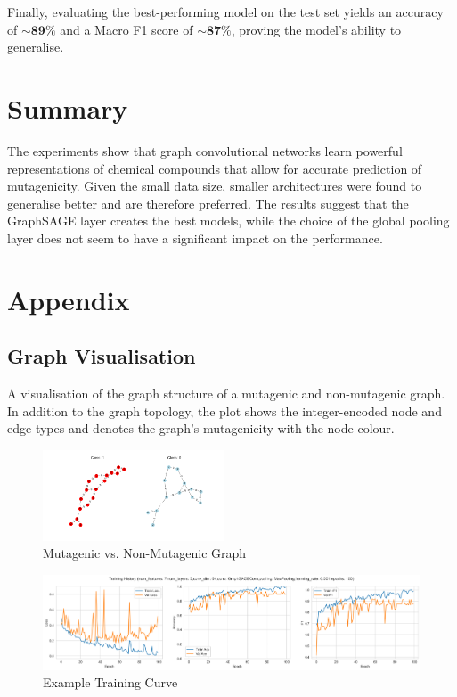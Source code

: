 \documentclass[10pt,conference,compsocconf]{IEEEtran}
\begin{document}
Finally, evaluating the best-performing model on the test set yields an accuracy
of $\sim\mathbf{89}\%$ and a Macro F1 score of $\sim\mathbf{87}\%$, proving the
model's ability to generalise.

\section{Summary}

The experiments show that graph convolutional networks learn powerful
representations of chemical compounds that allow for accurate prediction of
mutagenicity. Given the small data size, smaller architectures were found to
generalise better and are therefore preferred. The results suggest that the
GraphSAGE layer creates the best models, while the choice of the global pooling
layer does not seem to have a significant impact on the performance.

\newpage



\section{Appendix}

\subsection{Graph Visualisation}

A visualisation of the graph structure of a mutagenic and non-mutagenic graph.
In addition to the graph topology, the plot shows the integer-encoded node and
edge types and denotes the graph's mutagenicity with the node colour.

\begin{figure}[h!]
  \includegraphics[width=0.48\textwidth]{../plots/graphs.png}
  \caption{Mutagenic vs. Non-Mutagenic Graph}
  \label{fig:graph}
\end{figure}


\begin{figure}[b]
  \centering
  \includegraphics[width=\textwidth]{../plots/training.png}
  \caption{Example Training Curve}
  \label{fig:training}
\end{figure}
\end{document}
